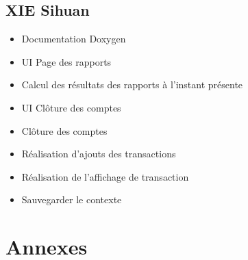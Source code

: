 \documentclass[10pt,a4paper,openany]{report}
\begin{document}
	\subsection{XIE Sihuan}
	\begin{itemize}
		\item Documentation Doxygen
		\item UI Page des rapports
		\item Calcul des résultats des rapports à l'instant présente
		\item UI Clôture des comptes
		\item Clôture des comptes
		\item Réalisation d'ajouts des transactions
		\item Réalisation de l'affichage de transaction
		\item Sauvegarder le contexte
	\end{itemize}

	\section{Annexes}
\end{document}
